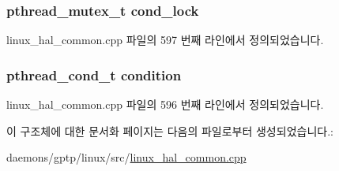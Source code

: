 \subsubsection[{\texorpdfstring{cond\+\_\+lock}{cond_lock}}]{\setlength{\rightskip}{0pt plus 5cm}pthread\+\_\+mutex\+\_\+t cond\+\_\+lock}\hypertarget{struct_ticketing_lock_private_ae3e5051fe73e5989a4d275ba3f947f64}{}\label{struct_ticketing_lock_private_ae3e5051fe73e5989a4d275ba3f947f64}


linux\+\_\+hal\+\_\+common.\+cpp 파일의 597 번째 라인에서 정의되었습니다.

\subsubsection[{\texorpdfstring{condition}{condition}}]{\setlength{\rightskip}{0pt plus 5cm}pthread\+\_\+cond\+\_\+t condition}\hypertarget{struct_ticketing_lock_private_a2d017047068ee847b500c14427ac4d6b}{}\label{struct_ticketing_lock_private_a2d017047068ee847b500c14427ac4d6b}


linux\+\_\+hal\+\_\+common.\+cpp 파일의 596 번째 라인에서 정의되었습니다.



이 구조체에 대한 문서화 페이지는 다음의 파일로부터 생성되었습니다.\+:\begin{DoxyCompactItemize}
\item 
daemons/gptp/linux/src/\hyperlink{linux__hal__common_8cpp}{linux\+\_\+hal\+\_\+common.\+cpp}\end{DoxyCompactItemize}
